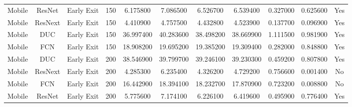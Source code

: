 \begin{tabular}{|c||c||c||c||c||c||c||c||c||c||c|}
Mobile & ResNet & Early Exit & 150 & 6.175800 & 7.086500 & 6.526700 & 6.539400 & 0.327000 & 0.625600 & Yes \\
Mobile & ResNext & Early Exit & 150 & 4.410900 & 4.757500 & 4.432800 & 4.523900 & 0.137700 & 0.096900 & Yes \\
Mobile & DUC & Early Exit & 150 & 36.997400 & 40.283600 & 38.498200 & 38.669900 & 1.111500 & 0.981900 & Yes \\
Mobile & FCN & Early Exit & 150 & 18.908200 & 19.695200 & 19.385200 & 19.309400 & 0.282000 & 0.848800 & Yes \\
Mobile & DUC & Early Exit & 200 & 38.546900 & 39.799700 & 39.246100 & 39.230300 & 0.459200 & 0.807800 & Yes \\
Mobile & ResNext & Early Exit & 200 & 4.285300 & 6.235400 & 4.326200 & 4.729200 & 0.756600 & 0.001400 & No \\
Mobile & FCN & Early Exit & 200 & 16.442900 & 18.394100 & 18.232700 & 17.870900 & 0.723200 & 0.008800 & No \\
Mobile & ResNet & Early Exit & 200 & 5.775600 & 7.174100 & 6.226100 & 6.419600 & 0.495900 & 0.776400 & Yes \\
\bottomrule
\end{tabular}
